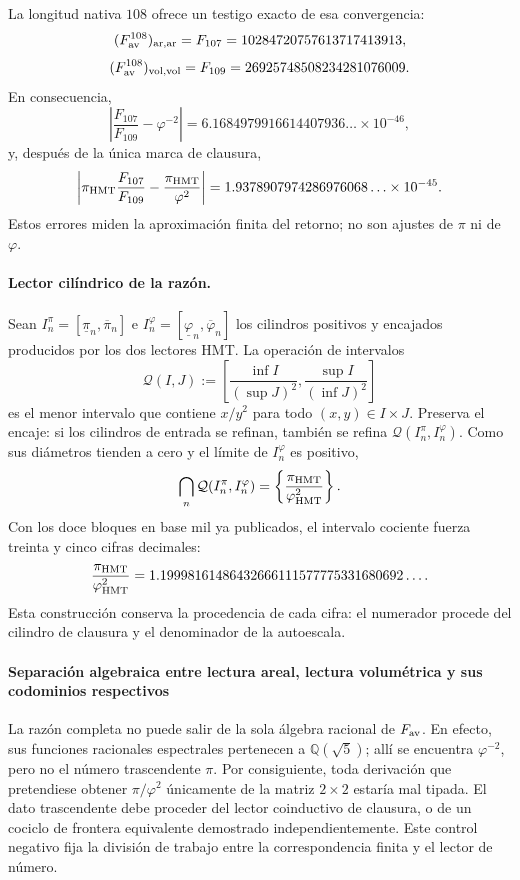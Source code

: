 La longitud nativa \(108\) ofrece un testigo exacto de esa convergencia:
\[
 (F_{\rm av}^{108})_{\rm ar,ar}
 =F_{107}=10284720757613717413913,
\]
\[
 (F_{\rm av}^{108})_{\rm vol,vol}
 =F_{109}=26925748508234281076009.
\]
En consecuencia,
\[
 \left|
 \frac{F_{107}}{F_{109}}-\varphi^{-2}
 \right|
 =
 6.1684979916614407936\ldots\times10^{-46},
\]
y, después de la única marca de clausura,
\[
 \left|
 \pi_{\rm HMT}\frac{F_{107}}{F_{109}}
 -\frac{\pi_{\rm HMT}}{\varphi^2}
 \right|
 =
 1.9378907974286976068\ldots\times10^{-45}.
\]
Estos errores miden la aproximación finita del retorno; no son ajustes de
\(\pi\) ni de \(\varphi\).

\paragraph{Lector cilíndrico de la razón.}
Sean \(I_n^\pi=[\underline\pi_n,\overline\pi_n]\) e
\(I_n^\varphi=[\underline\varphi_n,\overline\varphi_n]\) los cilindros
positivos y encajados producidos por los dos lectores HMT\@. La operación de
intervalos
\[
 \mathcal Q(I,J)
 :=
 \left[
 \frac{\inf I}{(\sup J)^2},
 \frac{\sup I}{(\inf J)^2}
 \right]
\]
es el menor intervalo que contiene \(x/y^2\) para todo
\((x,y)\in I\times J\). Preserva el encaje: si los cilindros de entrada se
refinan, también se refina \(\mathcal Q(I_n^\pi,I_n^\varphi)\). Como sus
diámetros tienden a cero y el límite de \(I_n^\varphi\) es positivo,
\[
 \bigcap_n\mathcal Q(I_n^\pi,I_n^\varphi)
 =
 \left\{\frac{\pi_{\rm HMT}}{\varphi_{\rm HMT}^2}\right\}.
\]
Con los doce bloques en base mil ya publicados, el intervalo cociente fuerza
treinta y cinco cifras decimales:
\[
 \frac{\pi_{\rm HMT}}{\varphi_{\rm HMT}^2}
 =
 1.19998161486432666111577775331680692\ldots.
\]
Esta construcción conserva la procedencia de cada cifra: el numerador
procede del cilindro de clausura y el denominador de la autoescala.

\paragraph{Separación algebraica entre lectura areal, lectura volumétrica y sus codominios respectivos}
La razón completa no puede salir de la sola álgebra racional de
\(F_{\rm av}\). En efecto, sus funciones racionales espectrales pertenecen a
\(\mathbb Q(\sqrt5)\); allí se encuentra \(\varphi^{-2}\), pero no el número
trascendente \(\pi\). Por consiguiente, toda derivación que pretendiese
obtener \(\pi/\varphi^2\) únicamente de la matriz \(2\times2\) estaría
mal tipada. El dato trascendente debe proceder del lector coinductivo de
clausura, o de un cociclo de frontera equivalente demostrado
independientemente. Este control negativo fija la división de trabajo entre
la correspondencia finita y el lector de número.

